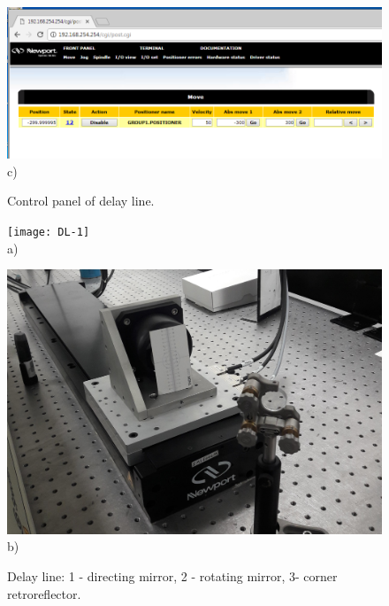\documentclass[14pt,a4paper] {article}
\begin{document}
\begin{figure}
\begin{minipage}{0.6\linewidth}
\includegraphics[width = 1\linewidth]{DL-5} \\c) 
\end{minipage}
\caption{Control panel of delay line.}
\label{fig:DL2}
\end{figure}

\begin{figure}
  \begin{minipage}{0.5\linewidth}
    \texttt{[image: DL-1]} \\a) 
  \end{minipage}
  \begin{minipage}{0.5\linewidth}
    \includegraphics[width = 1\linewidth]{DL-2} \\b) 
  \end{minipage}
  \caption{Delay line: 1 - directing mirror, 2 - rotating mirror, 3- corner retroreflector.}
  \label{fig:DL}
\end{figure} 
  
\end{document}
